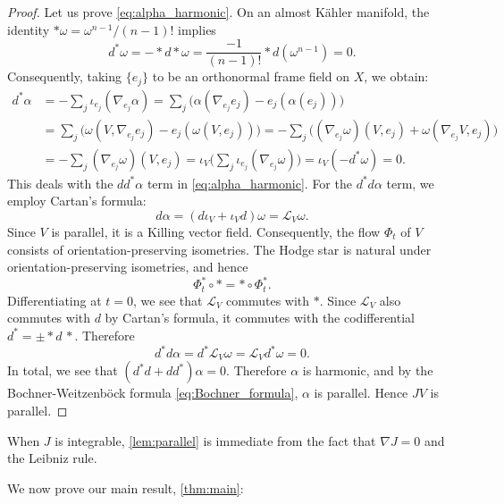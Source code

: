 \documentclass[11pt,twoside]{amsart}
\begin{document}
\begin{proof}
    Let us prove \eqref{eq:alpha_harmonic}. On an almost K\"ahler manifold, the identity $*\omega = \omega^{n-1}/(n-1)!$ implies
    $$ d^*\omega  = - * d  *\omega = \frac{-1}{(n-1)!} * d(\omega^{n-1}) =0.$$
    Consequently, taking $\{e_j\}$ to be an orthonormal frame field on $X$, we obtain:
    \begin{align*}
        d^*\alpha &= -\sum_j \iota_{e_j} (\nabla_{e_j}\alpha)=\sum_j\big(\alpha(\nabla_{e_j}e_j)-e_j(\alpha(e_j))\big) \\
        &=\sum_j\big(\omega(V,\nabla_{e_j}e_j)-e_j(\omega(V,e_j))\big)=-\sum_j\big((\nabla_{e_j}\omega)(V,e_j)+\omega(\nabla_{e_j}V,e_j)\big)\\
        &= -\sum_j(\nabla_{e_j}\omega)(V,e_j)= \iota_V\big(\sum_j\iota_{e_j}(\nabla_{e_j}\omega)\big)=\iota_V(-d^*\omega) = 0.
    \end{align*}
    This deals with the $dd^*\alpha$ term in \eqref{eq:alpha_harmonic}. For the $d^*d\alpha$ term, we employ Cartan's formula:
    \[
    d\alpha = (d\iota_V + \iota_V d)\omega = \mathscr L_V \omega.
    \] 
   Since $V$ is parallel, it is a Killing vector field.
Consequently, the flow $\Phi_t$ of $V$ consists of
orientation-preserving isometries. The Hodge star is natural under
orientation-preserving isometries, and hence
\[
    \Phi_t^*\circ *=*\circ\Phi_t^*.
\]
Differentiating at $t=0$, we see that $\mathscr{L}_V$ commutes with $*$.
Since $\mathscr L_V$ also commutes with $d$ by Cartan's formula, it commutes with the
codifferential $d^*=\pm * d \, *$. Therefore
\[
    d^*d\alpha
    =
    d^*\mathscr L_V\omega
    =
    \mathscr L_Vd^*\omega
    =
    0.
\]
In total, we see that $(d^*d +dd^*)\alpha=0$.
Therefore $\alpha$ is harmonic, and by the Bochner-Weitzenb\"ock formula \eqref{eq:Bochner_formula}, $\alpha$ is parallel. Hence $JV$ is parallel.
\end{proof}

\begin{remark}
    When $J$ is integrable, \autoref{lem:parallel} is immediate from the fact that $\nabla J = 0$ and the Leibniz rule.
\end{remark}

We now prove our main result, \autoref{thm:main}:
\end{document}
